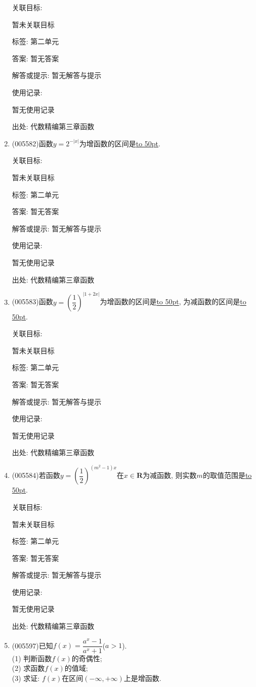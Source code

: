 \documentclass[10pt,a4paper]{article}
\newcommand{\blank}[1]{\underline{\hbox to #1pt{}}}
\begin{document}
\begin{enumerate}[1.]
关联目标:

暂未关联目标



标签: 第二单元

答案: 暂无答案

解答或提示: 暂无解答与提示

使用记录:

暂无使用记录


出处: 代数精编第三章函数
\item { (005582)}函数$y=2^{-|x|}$为增函数的区间是\blank{50}.


关联目标:

暂未关联目标



标签: 第二单元

答案: 暂无答案

解答或提示: 暂无解答与提示

使用记录:

暂无使用记录


出处: 代数精编第三章函数
\item { (005583)}函数$y=(\dfrac 12)^{|1+2x|}$为增函数的区间是\blank{50}, 为减函数的区间是\blank{50}.


关联目标:

暂未关联目标



标签: 第二单元

答案: 暂无答案

解答或提示: 暂无解答与提示

使用记录:

暂无使用记录


出处: 代数精编第三章函数
\item { (005584)}若函数$y=(\dfrac 12)^{(m^2-1)x}$在$x\in \mathbf{R}$为减函数, 则实数$m$的取值范围是\blank{50}.


关联目标:

暂未关联目标



标签: 第二单元

答案: 暂无答案

解答或提示: 暂无解答与提示

使用记录:

暂无使用记录


出处: 代数精编第三章函数
\item { (005597)}已知$f(x)=\dfrac{a^x-1}{a^x+1}$($a>1$).\\
(1) 判断函数$f(x)$的奇偶性;\\
(2) 求函数$f(x)$的值域;\\
(3) 求证: $f(x)$在区间$(-\infty ,+\infty)$上是增函数.



\end{enumerate}
\end{document}
